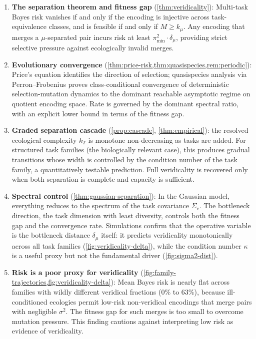 \documentclass[12pt]{article}
\newcommand{\dmu}{\delta_\mu}
\newcommand{\kmu}{k_\mu}
\newcommand{\pimin}{\pi_{\min}}
\newcommand{\sigmasq}{\sigma^2}
\begin{document}
\begin{enumerate}
\item \textbf{The separation theorem and fitness gap} (\cref{thm:veridicality}): Multi-task Bayes risk vanishes if and only if the encoding is injective across task-equivalence classes, and is feasible if and only if $M \ge \kmu$. Any encoding that merges a $\mu$-separated pair incurs risk at least $\pimin^2 \cdot \dmu$, providing strict selective pressure against ecologically invalid merges.

\item \textbf{Evolutionary convergence} (\cref{thm:price-risk,thm:quasispecies,rem:periodic}): Price's equation identifies the direction of selection; quasispecies analysis via Perron--Frobenius proves class-conditional convergence of deterministic selection-mutation dynamics to the dominant reachable asymptotic regime on quotient encoding space. Rate is governed by the dominant spectral ratio, with an explicit lower bound in terms of the fitness gap.

\item \textbf{Graded separation cascade} (\cref{prop:cascade}, \cref{thm:empirical}): the resolved ecological complexity $k_T$ is monotone non-decreasing as tasks are added. For structured task families (the biologically relevant case), this produces gradual transitions whose width is controlled by the condition number of the task family, a quantitatively testable prediction. Full veridicality is recovered only when both separation is complete and capacity is sufficient.

\item \textbf{Spectral control} (\cref{thm:gaussian-separation}): In the Gaussian model, everything reduces to the spectrum of the task covariance $\Sigma_c$. The bottleneck direction, the task dimension with least diversity, controls both the fitness gap and the convergence rate. Simulations confirm that the operative variable is the bottleneck distance $\dmu$ itself: it predicts veridicality monotonically across all task families (\cref{fig:veridicality-delta}), while the condition number $\kappa$ is a useful proxy but not the fundamental driver (\cref{fig:sigma2-dist}).

\item \textbf{Risk is a poor proxy for veridicality} (\cref{fig:family-trajectories,fig:veridicality-delta}): Mean Bayes risk is nearly flat across families with wildly different veridical fractions ($0\%$ to $63\%$), because ill-conditioned ecologies permit low-risk non-veridical encodings that merge pairs with negligible $\sigmasq$. The fitness gap for such merges is too small to overcome mutation pressure. This finding cautions against interpreting low risk as evidence of veridicality.


\end{enumerate}
\end{document}
